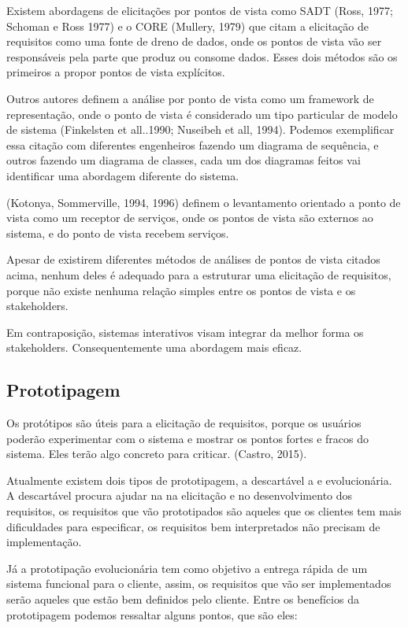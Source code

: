 Existem abordagens de elicitações por pontos de vista como SADT (Ross, 1977; Schoman e Ross 1977) e o CORE (Mullery, 1979) que citam a elicitação de requisitos como uma fonte de dreno de dados, onde os pontos de vista vão ser responsáveis pela parte que produz ou consome dados. Esses dois métodos são os primeiros a propor pontos de vista explícitos.

Outros autores definem a análise por ponto de vista como um framework de representação, onde o ponto de vista é considerado um tipo particular de modelo de sistema (Finkelsten et all..1990; Nuseibeh et all, 1994). Podemos exemplificar essa citação com diferentes engenheiros fazendo um diagrama de sequência, e outros fazendo um diagrama de classes, cada um dos diagramas feitos vai identificar uma abordagem diferente do sistema.

(Kotonya, Sommerville, 1994, 1996) definem o levantamento orientado a ponto de vista como um receptor de serviços, onde os pontos de vista são externos ao sistema, e do ponto de vista recebem serviços.

Apesar de existirem diferentes métodos de análises de pontos de vista citados acima, nenhum deles é adequado para a estruturar uma elicitação de requisitos, porque não existe nenhuma relação simples entre os pontos de vista e os stakeholders.

Em contraposição, sistemas interativos visam integrar da melhor forma os stakeholders. Consequentemente uma abordagem mais eficaz.

\subsection {Prototipagem}

Os protótipos são úteis para a elicitação de requisitos, porque os usuários poderão experimentar com o sistema e mostrar os pontos fortes e fracos do sistema. Eles terão algo concreto para criticar. (Castro, 2015).

Atualmente existem dois tipos de prototipagem, a descartável a e evolucionária. A descartável procura ajudar na na elicitação e no desenvolvimento dos requisitos, os requisitos que vão prototipados são aqueles que os clientes tem
mais dificuldades para especificar, os requisitos bem interpretados não precisam de implementação.

Já a prototipação evolucionária tem como objetivo a entrega rápida de um sistema funcional para o cliente, assim, os requisitos que vão ser implementados serão aqueles que estão bem definidos pelo cliente.
Entre os benefícios da prototipagem podemos ressaltar alguns pontos, que são eles:

